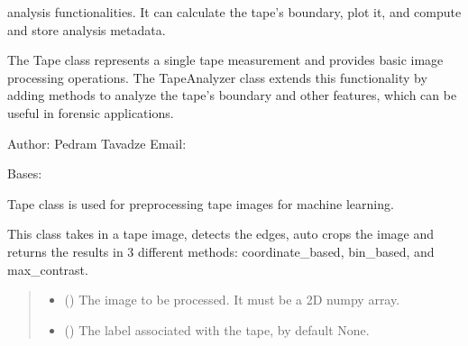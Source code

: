 \documentclass[letterpaper,10pt,english]{sphinxmanual}
\begin{document}
\sphinxAtStartPar
analysis functionalities. It can calculate the tape’s boundary,
plot it, and compute and store analysis metadata.

\sphinxAtStartPar
The Tape class represents a single tape measurement and provides
basic image processing operations. The TapeAnalyzer class extends
this functionality by adding methods to analyze the tape’s boundary
and other features, which can be useful in forensic applications.

\sphinxAtStartPar
Author: Pedram Tavadze
Email: 

\begin{fulllineitems}
\label{\detokenize{forensicfit.core.tape:forensicfit.core.tape.Tape}}
\pysigstartsignatures
{}
\pysigstopsignatures
\sphinxAtStartPar
Bases: 

\sphinxAtStartPar
Tape class is used for preprocessing tape images for machine learning.

\sphinxAtStartPar
This class takes in a tape image, detects the edges, auto crops the image and
returns the results in 3 different methods: coordinate\_based, bin\_based,
and max\_contrast.
\begin{quote}\begin{description}
\begin{itemize}
\item {} 
\sphinxAtStartPar
{} () \textendash{} The image to be processed. It must be a 2D numpy array.

\item {} 
\sphinxAtStartPar
{} (\sphinxstyleliteralemphasis{\sphinxupquote{, }}) \textendash{} The label associated with the tape, by default None.


\end{itemize}
\end{description}
\end{quote}
\end{fulllineitems}
\end{document}
